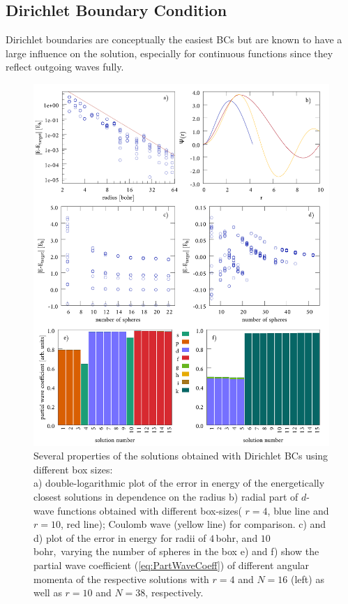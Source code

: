 \subsection{Dirichlet Boundary Condition}
\label{sec:DBCbench}
Dirichlet boundaries are conceptually the easiest BCs but are known to have a large influence on the solution, especially for continuous functions since they reflect outgoing waves fully.
\begin{figure}
\includegraphics[width=\textwidth]{Figures/BC/DirichletBC}
\caption{Several properties of the solutions obtained with Dirichlet BCs using different box sizes:\\
a) double-logarithmic plot of the error in energy of the energetically closest solutions in dependence on the radius
b) radial part of $d$-wave functions obtained with different box-sizes( $r=4$, blue line and $r=10$, red line); Coulomb wave (yellow line) for comparison.
c) and d) plot of the error in energy for radii of $4\,$bohr, and $10\,$bohr,\ varying the number of spheres in the box
e) and f) show the partial wave coefficient (\ref{eq:PartWaveCoeff}) of different angular momenta of the respective solutions with $r=4$ and $N=16$ (left) as well as $r=10$ and $N=38$, respectively.}
\label{fig:dbcRad}
\end{figure}
